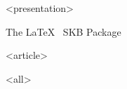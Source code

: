 \mode
<presentation>

\begin{frame}{The \LaTeX~ SKB Package}
  \label{about}

\end{frame}

\mode
<article>

\bigskip

\mode
<all>
